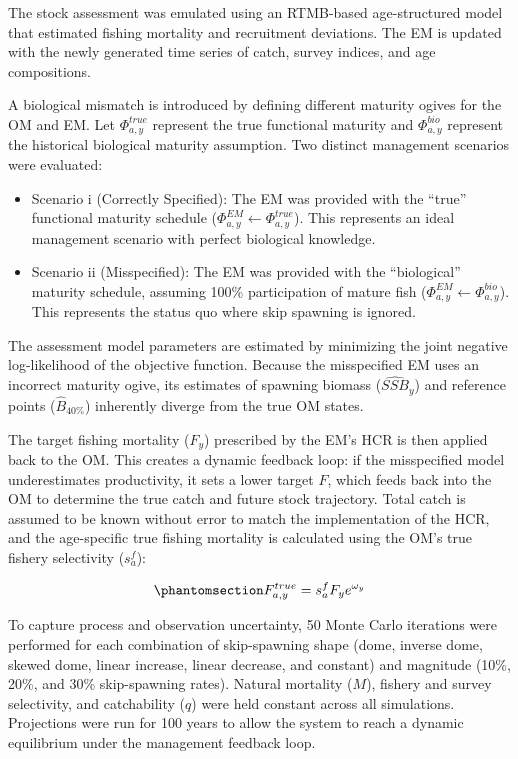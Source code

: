 \documentclass[
  authoryear,
  preprint,
  3p]{elsarticle}
\providecommand{\tightlist}{%
  \setlength{\itemsep}{0pt}\setlength{\parskip}{0pt}}
\begin{document}
The stock assessment \citep{Williams2023} was emulated using an
RTMB-based age-structured model that estimated fishing mortality and
recruitment deviations. The EM is updated with the newly generated time
series of catch, survey indices, and age compositions.

A biological mismatch is introduced by defining different maturity
ogives for the OM and EM. Let \(\Phi^{true}_{a,y}\) represent the true
functional maturity and \(\Phi^{bio}_{a,y}\) represent the historical
biological maturity assumption. Two distinct management scenarios were
evaluated:

\begin{itemize}
\tightlist
\item
  Scenario i (Correctly Specified): The EM was provided with the
  ``true'' functional maturity schedule
  (\(\Phi^{EM}_{a,y} \leftarrow \Phi^{true}_{a,y}\)). This represents an
  ideal management scenario with perfect biological knowledge.
\item
  Scenario ii (Misspecified): The EM was provided with the
  ``biological'' maturity schedule, assuming 100\% participation of
  mature fish (\(\Phi^{EM}_{a,y} \leftarrow \Phi^{bio}_{a,y}\)). This
  represents the status quo where skip spawning is ignored.
\end{itemize}

The assessment model parameters are estimated by minimizing the joint
negative log-likelihood of the objective function. Because the
misspecified EM uses an incorrect maturity ogive, its estimates of
spawning biomass (\(\hat{SSB}_{y}\)) and reference points
(\(\hat{B}_{40\%}\)) inherently diverge from the true OM states.

The target fishing mortality (\(F_y\)) prescribed by the EM's HCR is
then applied back to the OM. This creates a dynamic feedback loop: if
the misspecified model underestimates productivity, it sets a lower
target \(F\), which feeds back into the OM to determine the true catch
and future stock trajectory. Total catch is assumed to be known without
error to match the implementation of the HCR, and the age-specific true
fishing mortality is calculated using the OM's true fishery selectivity
(\(s_a^f\)):

\begin{equation}\protect\phantomsection\label{eq-f-true}{
F_{a,y}^{true} = s_a^f F_y e^{\omega_y}
}\end{equation}

To capture process and observation uncertainty, 50 Monte Carlo
iterations were performed for each combination of skip-spawning shape
(dome, inverse dome, skewed dome, linear increase, linear decrease, and
constant) and magnitude (10\%, 20\%, and 30\% skip-spawning rates).
Natural mortality (\(M\)), fishery and survey selectivity, and
catchability (\(q\)) were held constant across all simulations.
Projections were run for 100 years to allow the system to reach a
dynamic equilibrium under the management feedback loop.
\end{document}
